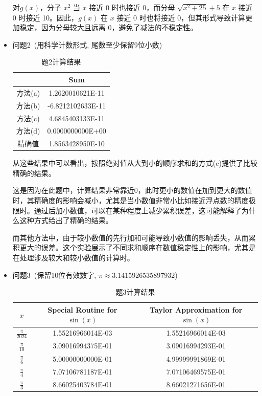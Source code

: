 \documentclass[UTF8]{ctexart}
\begin{document}
\begin{itemize}
对\(g(x)\)，分子 \( x^2 \) 当 \( x \) 接近 0 时也接近 0，而分母 \( \sqrt{x^2 + 25} + 5 \) 在 \( x \) 接近 0 时接近 10。因此，\( g(x) \) 在 \( x \) 接近 0 时也将接近 0，但其形式导致计算更加稳定，因为分母较大且远离 0，避免了减法的不稳定性。


 \item  问题2~(用科学计数形式, 尾数至少保留9位小数)


 \begin{table}[htb]
 \begin{center}

\begin{tabular}{|c|c|}
\hline
      & Sum               \\ \hline
方法(a) & 1.2620010621E-11  \\ \hline
方法(b) & -6.8212102633E-11 \\ \hline
方法(c) & 4.6845403133E-11  \\ \hline
方法(d) & 0.0000000000E+00  \\ \hline
精确值  & 1.8563428950E-10  \\ \hline
\end{tabular}

\end{center}
\caption{题2计算结果}
\end{table}


从这些结果中可以看出，按照绝对值从大到小的顺序求和的方式(c)提供了比较精确的结果。

这是因为在此题中，计算结果非常靠近0，此时更小的数值在加到更大的数值时，其精确度的影响会减小，尤其是当小数值非常小比如接近浮点数的精度极限时。通过后加小数值，可以在某种程度上减少累积误差，这可能解释了为什么这种方式给出了精确的结果。

而其他方法中，由于较小数值的先行加和可能导致小数值的影响丢失，从而累积更大的误差。这个实验展示了不同求和顺序在数值稳定性上的影响，尤其是在处理涉及较大和较小数值的计算时。


 \item  问题3~(保留10位有效数字, $\pi \approx 3.14159 26535 897932$)
  \begin{table}[htb]
 \begin{center}
\begin{tabular}{|c|c|c|} %
\hline
 $x$  & Special Routine for $\sin(x)$ & Taylor Approximation for $\sin(x)$  \\
\hline
  $\frac{\pi}{2024}$ & 1.55216966014E-03 & 1.55216966014E-03 \\
  \hline
  $\frac{\pi}{10}$ & 3.09016994375E-01 & 3.09016994293E-01 \\ \hline
  $\frac{\pi}{6}$ & 5.00000000000E-01 & 4.99999991869E-01 \\ \hline
  $\frac{\pi}{4}$ & 7.07106781187E-01 & 7.07106469575E-01 \\  \hline
  $\frac{\pi}{3}$ & 8.66025403784E-01 & 8.66021271656E-01 \\
\hline
\end{tabular}
\end{center}
\caption{题3计算结果}
\end{table}


\end{itemize}
\end{document}
